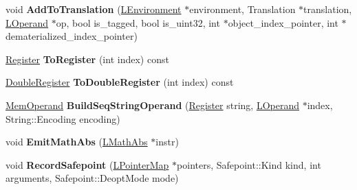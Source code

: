 \begin{DoxyCompactItemize}
\item 
void {\bfseries Add\+To\+Translation} (\hyperlink{classv8_1_1internal_1_1_l_environment}{L\+Environment} $\ast$environment, Translation $\ast$translation, \hyperlink{classv8_1_1internal_1_1_l_operand}{L\+Operand} $\ast$op, bool is\+\_\+tagged, bool is\+\_\+uint32, int $\ast$object\+\_\+index\+\_\+pointer, int $\ast$dematerialized\+\_\+index\+\_\+pointer)\hypertarget{classv8_1_1internal_1_1_l_code_gen_a418f466c19b6671a29663f4378a36d8c}{}\label{classv8_1_1internal_1_1_l_code_gen_a418f466c19b6671a29663f4378a36d8c}

\item 
\hyperlink{structv8_1_1internal_1_1_register}{Register} {\bfseries To\+Register} (int index) const \hypertarget{classv8_1_1internal_1_1_l_code_gen_ae4d98c4f4146a2d8ea844342a5bae0ea}{}\label{classv8_1_1internal_1_1_l_code_gen_ae4d98c4f4146a2d8ea844342a5bae0ea}

\item 
\hyperlink{structv8_1_1internal_1_1_double_register}{Double\+Register} {\bfseries To\+Double\+Register} (int index) const \hypertarget{classv8_1_1internal_1_1_l_code_gen_a371876b861c4031096e632a0af70b549}{}\label{classv8_1_1internal_1_1_l_code_gen_a371876b861c4031096e632a0af70b549}

\item 
\hyperlink{classv8_1_1internal_1_1_mem_operand}{Mem\+Operand} {\bfseries Build\+Seq\+String\+Operand} (\hyperlink{structv8_1_1internal_1_1_register}{Register} string, \hyperlink{classv8_1_1internal_1_1_l_operand}{L\+Operand} $\ast$index, String\+::\+Encoding encoding)\hypertarget{classv8_1_1internal_1_1_l_code_gen_a20aee7187252d655324a448e52b821d2}{}\label{classv8_1_1internal_1_1_l_code_gen_a20aee7187252d655324a448e52b821d2}

\item 
void {\bfseries Emit\+Math\+Abs} (\hyperlink{classv8_1_1internal_1_1_l_math_abs}{L\+Math\+Abs} $\ast$instr)\hypertarget{classv8_1_1internal_1_1_l_code_gen_a1181453c30d08db48c3bf19fc7515b2c}{}\label{classv8_1_1internal_1_1_l_code_gen_a1181453c30d08db48c3bf19fc7515b2c}

\item 
void {\bfseries Record\+Safepoint} (\hyperlink{classv8_1_1internal_1_1_l_pointer_map}{L\+Pointer\+Map} $\ast$pointers, Safepoint\+::\+Kind kind, int arguments, Safepoint\+::\+Deopt\+Mode mode)\hypertarget{classv8_1_1internal_1_1_l_code_gen_a5c5e6c0360111f74e6c274c456c70b74}{}\label{classv8_1_1internal_1_1_l_code_gen_a5c5e6c0360111f74e6c274c456c70b74}


\end{DoxyCompactItemize}

